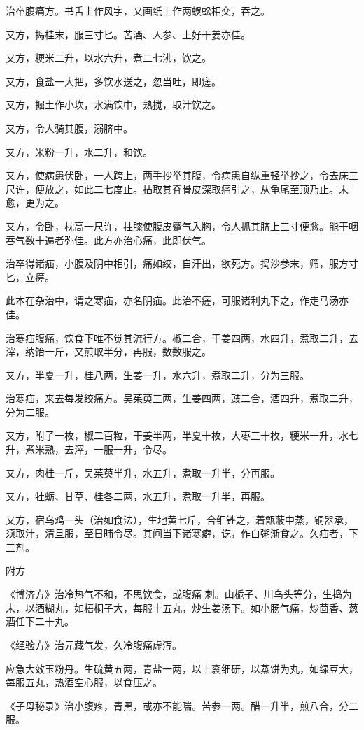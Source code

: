 \documentclass[12pt,UTF8]{ctexbook}
\begin{document}
治卒腹痛方。书舌上作风字，又画纸上作两蜈蚣相交，吞之。

又方，捣桂末，服三寸匕。苦酒、人参、上好干姜亦佳。

又方，粳米二升，以水六升，煮二七沸，饮之。

又方，食盐一大把，多饮水送之，忽当吐，即瘥。

又方，掘土作小坎，水满饮中，熟搅，取汁饮之。

又方，令人骑其腹，溺脐中。

又方，米粉一升，水二升，和饮。

又方，使病患伏卧，一人跨上，两手抄举其腹，令病患自纵重轻举抄之，令去床三尺许，便放之，如此二七度止。拈取其脊骨皮深取痛引之，从龟尾至顶乃止。未愈，更为之。

又方，令卧，枕高一尺许，拄膝使腹皮蹙气入胸，令人抓其脐上三寸便愈。能干咽吞气数十遍者弥佳。此方亦治心痛，此即伏气。

治卒得诸疝，小腹及阴中相引，痛如绞，自汗出，欲死方。捣沙参末，筛，服方寸匕，立瘥。

此本在杂治中，谓之寒疝，亦名阴疝。此治不瘥，可服诸利丸下之，作走马汤亦佳。

治寒疝腹痛，饮食下唯不觉其流行方。椒二合，干姜四两，水四升，煮取二升，去滓，纳饴一斤，又煎取半分，再服，数数服之。

又方，半夏一升，桂八两，生姜一升，水六升，煮取二升，分为三服。

治寒疝，来去每发绞痛方。吴茱萸三两，生姜四两，豉二合，酒四升，煮取二升，分为二服。

又方，附子一枚，椒二百粒，干姜半两，半夏十枚，大枣三十枚，粳米一升，水七升，煮米熟，去滓，一服一升，令尽。

又方，肉桂一斤，吴茱萸半升，水五升，煮取一升半，分再服。

又方，牡蛎、甘草、桂各二两，水五升，煮取一升半，再服。

又方，宿乌鸡一头（治如食法），生地黄七斤，合细锉之，着甑蔽中蒸，铜器承，须取汁，清旦服，至日晡令尽。其间当下诸寒癖，讫，作白粥渐食之。久疝者，下三剂。

附方

《博济方》治冷热气不和，不思饮食，或腹痛 刺。山栀子、川乌头等分，生捣为末，以酒糊丸，如梧桐子大，每服十五丸，炒生姜汤下。如小肠气痛，炒茴香、葱酒任下二十丸。

《经验方》治元藏气发，久冷腹痛虚泻。

应急大效玉粉丹。生硫黄五两，青盐一两，以上衮细研，以蒸饼为丸，如绿豆大，每服五丸，热酒空心服，以食压之。

《子母秘录》治小腹疼，青黑，或亦不能喘。苦参一两。醋一升半，煎八合，分二服。
\end{document}

